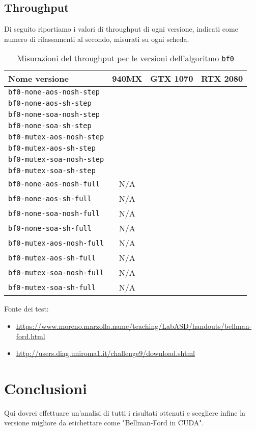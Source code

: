 \documentclass[a4paper]{article}
\begin{document}
	\subsection{Throughput}
	Di seguito riportiamo i valori di throughput di ogni versione, indicati come numero di rilassamenti al secondo, misurati su ogni scheda.
	\begin{table}[!ht]
		\centering
		\begin{tabular}{|l|c|c|c|}
			\hline
			\textbf{Nome versione} & \textbf{940MX} & \textbf{GTX 1070} & \textbf{RTX 2080} \\ \hline
			\texttt{bf0-none-aos-nosh-step}  &  &  &  \\ \hline
			\texttt{bf0-none-aos-sh-step}    &  &  &  \\ \hline
			\texttt{bf0-none-soa-nosh-step}  &  &  &  \\ \hline
			\texttt{bf0-none-soa-sh-step}    &  &  &  \\ \hline
			\texttt{bf0-mutex-aos-nosh-step} &  &  &  \\ \hline
			\texttt{bf0-mutex-aos-sh-step}   &  &  &  \\ \hline
			\texttt{bf0-mutex-soa-nosh-step} &  &  &  \\ \hline
			\texttt{bf0-mutex-soa-sh-step}   &  &  &  \\ \hline
			\texttt{bf0-none-aos-nosh-full}  & N/A &  &  \\ \hline
			\texttt{bf0-none-aos-sh-full}    & N/A &  &  \\ \hline
			\texttt{bf0-none-soa-nosh-full}  & N/A &  &  \\ \hline
			\texttt{bf0-none-soa-sh-full}    & N/A &  &  \\ \hline
			\texttt{bf0-mutex-aos-nosh-full} & N/A &  &  \\ \hline
			\texttt{bf0-mutex-aos-sh-full}   & N/A &  &  \\ \hline
			\texttt{bf0-mutex-soa-nosh-full} & N/A &  &  \\ \hline
			\texttt{bf0-mutex-soa-sh-full}   & N/A &  &  \\ \hline
		\end{tabular}
		\label{tab:throughput_bf0}
		\caption{Misurazioni del throughput per le versioni dell'algoritmo \texttt{bf0}}
	\end{table}
	
	
	
	Fonte dei test:
	\begin{itemize}
		\item \url{https://www.moreno.marzolla.name/teaching/LabASD/handouts/bellman-ford.html}
		\item \url{http://users.diag.uniroma1.it/challenge9/download.shtml}
	\end{itemize}
	
	\section{Conclusioni}
	\label{section:end}
	Qui dovrei effettuare un'analisi di tutti i risultati ottenuti e scegliere infine la versione migliore da etichettare come "Bellman-Ford in CUDA".
	
	\printbibliography
	
\end{document}
